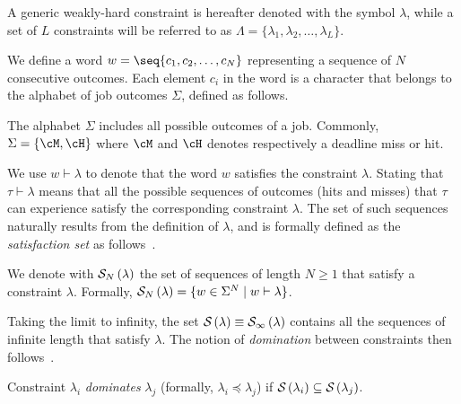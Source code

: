 %
A generic weakly-hard constraint is hereafter denoted with the symbol $\lambda$, while a set of $L$ constraints will be referred to as $\Lambda = \{ \lambda_1, \lambda_2, \dots, \lambda_L \}$.

We define a word $w= \seq{c_1, c_2, \dots, c_N}$ representing a sequence of $N$ consecutive outcomes.
Each element $c_i$ in the word is a character that belongs to the alphabet of job outcomes $\Sigma$, defined as follows.

\begin{definition}%
    \label{def:basic-alphabet}%
    The alphabet $\Sigma$ includes all possible outcomes of a job.
    Commonly, $\Sigma = \{ \cM, \cH \}$ where $\cM$ and $\cH$ denotes respectively a deadline miss or hit.
\end{definition}

We use $w \vdash \lambda$ to denote that the word $w$ satisfies the constraint $\lambda$. 
Stating that $\tau \vdash \lambda$ means that all the possible sequences of outcomes (hits and misses) that $\tau$ can experience satisfy the corresponding constraint $\lambda$.
The set of such sequences naturally results from the definition of $\lambda$, and is formally defined as the \emph{satisfaction set} as follows~\cite{Bernat:2001}.

\begin{definition}%
    \label{def:satisfaction}%
    We denote with $\mathcal{S}_{N}\left( \lambda \right)$ the set of sequences of length $N \geq 1$ that satisfy a constraint $\lambda$.
    Formally, $\mathcal{S}_{N}\left( \lambda \right) = \{ w \in \Sigma^N \mid w \vdash \lambda \}$.
\end{definition}
Taking the limit to infinity, the set $\mathcal{S}_{}\left( \lambda \right) \equiv \mathcal{S}_{\infty}\left( \lambda \right)$ contains all the sequences of infinite length that satisfy $\lambda$.
%
The notion of \emph{domination} between constraints then follows~\cite{Bernat:2001}.
\begin{definition}%
    \label{def:domination}%
    Constraint $\lambda_i$ \emph{dominates} $\lambda_j$ (formally, $\lambda_i \preceq \lambda_j$) if $\mathcal{S}_{}\left( \lambda_i \right) \subseteq \mathcal{S}_{}\left( \lambda_j \right)$. 
\end{definition}


